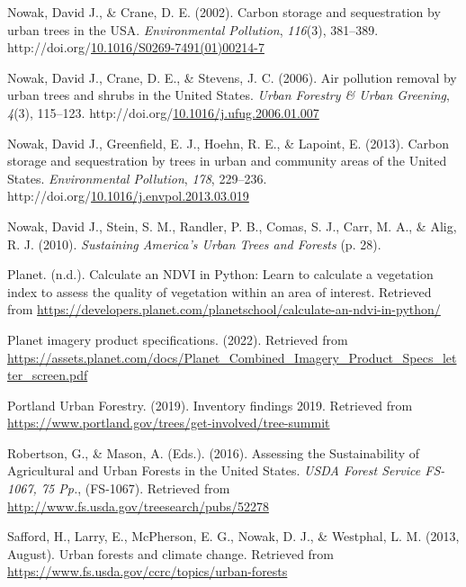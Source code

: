 \documentclass[12pt,twoside]{reedthesis}
\newlength{\cslhangindent}
\newenvironment{CSLReferences}[2] %
 {%
  \setlength{\parindent}{0pt}
  \ifodd #1 \everypar{\setlength{\hangindent}{\cslhangindent}}\ignorespaces\fi
  \ifnum #2 > 0
  \setlength{\parskip}{#2\baselineskip}
  \fi
 }%
 {}
\begin{document}
\begin{CSLReferences}{1}{0}
\leavevmode{}%
Nowak, David J., \& Crane, D. E. (2002). Carbon storage and sequestration by urban trees in the USA. \emph{Environmental Pollution}, \emph{116}(3), 381--389. http://doi.org/\href{https://doi.org/10.1016/S0269-7491(01)00214-7}{10.1016/S0269-7491(01)00214-7}

\leavevmode{}%
Nowak, David J., Crane, D. E., \& Stevens, J. C. (2006). Air pollution removal by urban trees and shrubs in the United States. \emph{Urban Forestry \& Urban Greening}, \emph{4}(3), 115--123. http://doi.org/\href{https://doi.org/10.1016/j.ufug.2006.01.007}{10.1016/j.ufug.2006.01.007}

\leavevmode{}%
Nowak, David J., Greenfield, E. J., Hoehn, R. E., \& Lapoint, E. (2013). Carbon storage and sequestration by trees in urban and community areas of the United States. \emph{Environmental Pollution}, \emph{178}, 229--236. http://doi.org/\href{https://doi.org/10.1016/j.envpol.2013.03.019}{10.1016/j.envpol.2013.03.019}

\leavevmode{}%
Nowak, David J., Stein, S. M., Randler, P. B., Comas, S. J., Carr, M. A., \& Alig, R. J. (2010). \emph{Sustaining America{'}s Urban Trees and Forests} (p. 28).

\leavevmode{}%
Planet. (n.d.). Calculate an NDVI in Python: Learn to calculate a vegetation index to assess the quality of vegetation within an area of interest. Retrieved from \url{https://developers.planet.com/planetschool/calculate-an-ndvi-in-python/}

\leavevmode{}%
Planet imagery product specifications. (2022). Retrieved from \url{https://assets.planet.com/docs/Planet_Combined_Imagery_Product_Specs_letter_screen.pdf}

\leavevmode{}%
Portland Urban Forestry. (2019). Inventory findings 2019. Retrieved from \url{https://www.portland.gov/trees/get-involved/tree-summit}

\leavevmode{}%
Robertson, G., \& Mason, A. (Eds.). (2016). Assessing the Sustainability of Agricultural and Urban Forests in the United States. \emph{USDA Forest Service FS-1067, 75 Pp.}, (FS-1067). Retrieved from \url{http://www.fs.usda.gov/treesearch/pubs/52278}

\leavevmode{}%
Safford, H., Larry, E., McPherson, E. G., Nowak, D. J., \& Westphal, L. M. (2013, August). Urban forests and climate change. Retrieved from \url{https://www.fs.usda.gov/ccrc/topics/urban-forests}


\end{CSLReferences}
\end{document}
